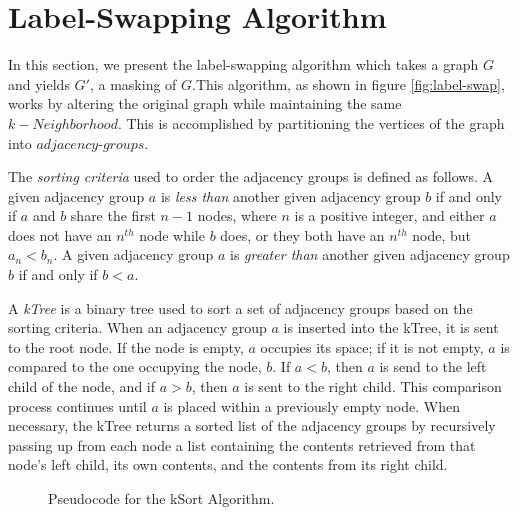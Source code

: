 \section{Label-Swapping Algorithm}
\indent In this section, we present the label-swapping algorithm which takes a graph $G$ and yields $G'$, a masking of $G$.This algorithm, as shown in figure \ref{fig:label-swap}, works by altering the original graph while maintaining the same $k-Neighborhood$. This is accomplished by partitioning the vertices of the graph into $adjacency$-$groups$.

\begin{definition}
	The \emph{sorting criteria} used to order the adjacency groups is defined as follows. A given adjacency group $a$ is \emph{less than} another given adjacency group $b$ if and only if $a$ and $b$ share the first $n - 1$ nodes, where $n$ is a positive integer, and either $a$ does not have an $n^{th}$ node while $b$ does, or they both have an $n^{th}$ node, but $a_n < b_n$. A given adjacency group $a$ is \emph{greater than} another given adjacency group $b$ if and only if $b < a$.
\end{definition}

\begin{definition}
	A \emph{kTree} is a binary tree used to sort a set of adjacency groups based on the sorting criteria. When an adjacency group $a$ is inserted into the kTree, it is sent to the root node. If the node is empty, $a$ occupies its space; if it is not empty, $a$ is compared to the one occupying the node, $b$. If $a < b$, then $a$ is send to the left child of the node, and if $a > b$, then $a$ is sent to the right child. This comparison process continues until $a$ is placed within a previously empty node. When necessary, the kTree returns a sorted list of the adjacency groups by recursively passing up from each node a list containing the contents retrieved from that node's left child, its own contents, and the contents from its right child.
\end{definition}

\begin{figure}[H]
	\begin{algorithmic}
		\renewcommand{\algorithmicrequire}{\textbf{Input:}}
		\renewcommand{\algorithmicensure}{\textbf{Output:}}
		\EndFor
		\State {}
	\end{algorithmic}
	\caption{Pseudocode for the kSort Algorithm.}
	\label{fig:kSort}
\end{figure}

